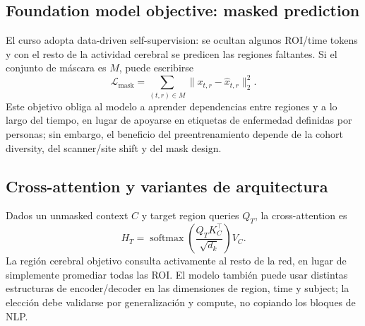 \subsection{Foundation model objective: masked prediction}

El curso adopta data-driven self-supervision: se ocultan algunos ROI/time tokens y con el resto de la actividad cerebral se predicen las regiones faltantes. Si el conjunto de máscara es $M$, puede escribirse
\[
\mathcal{L}_{\text{mask}}=\sum_{(t,r)\in M}\|x_{t,r}-\hat{x}_{t,r}\|_2^2.
\]
Este objetivo obliga al modelo a aprender dependencias entre regiones y a lo largo del tiempo, en lugar de apoyarse en etiquetas de enfermedad definidas por personas; sin embargo, el beneficio del preentrenamiento depende de la cohort diversity, del scanner/site shift y del mask design.






\subsection{Cross-attention y variantes de arquitectura}

Dados un unmasked context $C$ y target region queries $Q_T$, la cross-attention es
\[
H_T=\operatorname{softmax}\!\left(\frac{Q_TK_C^{\top}}{\sqrt{d_k}}\right)V_C.
\]
La región cerebral objetivo consulta activamente al resto de la red, en lugar de simplemente promediar todas las ROI. El modelo también puede usar distintas estructuras de encoder/decoder en las dimensiones de region, time y subject; la elección debe validarse por generalización y compute, no copiando los bloques de NLP.




